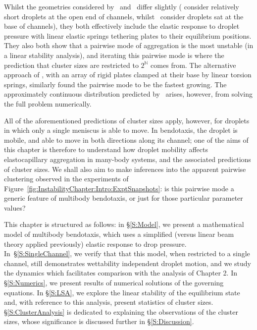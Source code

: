 Whilst the geometries considered by~\cite{Gat2013JFM} and~\cite{Singh2014JFM} differ slightly (\cite{Gat2013JFM} consider relatively short droplets at the open end of channels, whilst~\cite{Singh2014JFM} consider droplets sat at the base of channels), they both effectively include the elastic response to droplet pressure with linear elastic springs tethering plates to their equilibrium positions. They also both show that a pairwise mode of aggregation is the most unstable (in a linear stability analysis), and iterating this pairwise mode is where the prediction that cluster sizes are restricted to
 $2^\mathbb{N}$ comes from. The alternative approach of \cite{Wei2014EPL}, with an array of rigid plates clamped at their base by linear torsion springs, similarly found the pairwise mode to be the fastest growing. The approximately continuous distribution predicted by~\cite{Singh2014JFM} arises, however, from solving the full problem numerically.

All of the aforementioned predictions of cluster sizes apply, however, for droplets in which only a single meniscus is able to move. In bendotaxis, the droplet is mobile, and able to move in both directions along its channel; one of the aims of this chapter is therefore to understand how droplet mobility affects elastocapillary aggregation in many-body systems, and the associated predictions of cluster sizes. We shall also aim to make inferences into the apparent pairwise clustering observed in the experiments of Figure~\ref{fig:InstabilityChapter:Intro:ExptSnapshots}: is this pairwise mode a generic feature of multibody bendotaxis, or just for those particular parameter values?

This chapter is structured as follows: in \S\ref{S:Model}, we present a mathematical model of multibody bendotaxis, which uses a simplified (versus linear beam theory applied previously) elastic response to drop pressure. In~\S\ref{S:SingleChannel}, we verify that that this model, when restricted to a single channel, still demonstrates wettability independent droplet motion, and we study the dynamics which facilitates comparison with the analysis of Chapter 2. In \S\ref{S:Numerics}, we present results of numerical solutions of the governing equations. In \S\ref{S:LSA}, we explore the linear stability of the equilibrium state and, with reference to this analysis, present statistics of cluster sizes. \S\ref{S:ClusterAnalysis} is dedicated to explaining the observations of the cluster sizes, whose significance is discussed further in \S\ref{S:Discussion}.



